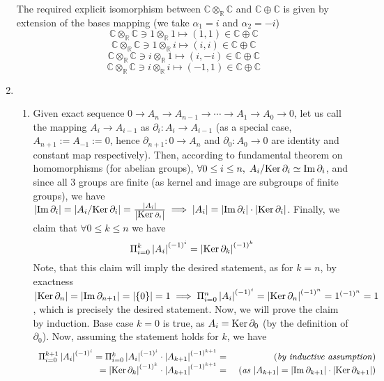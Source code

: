 \documentclass[8pt,fleqn]{article} %
\newcommand{\Ker}{\mbox{\normalfont Ker\,}}
\begin{document}
\begin{enumerate}[label=\bfseries Problem \arabic*.]
		The required explicit isomorphism between $\mathbb{C}\otimes_{\mathbb{R}}\mathbb{C}$ and $\mathbb{C}\oplus\mathbb{C}$ is given
		by extension of the bases mapping (we take $\alpha_1=i$ and $\alpha_2=-i$)
		\[\mathbb{C}\otimes_{\mathbb{R}}\mathbb{C}\ni 1\otimes_{\mathbb{R}}1 \mapsto (1,1) \in\mathbb{C}\oplus\mathbb{C}\]
		\[\mathbb{C}\otimes_{\mathbb{R}}\mathbb{C}\ni 1\otimes_{\mathbb{R}}i \mapsto (i,i)\in\mathbb{C}\oplus\mathbb{C}\]
		\[\mathbb{C}\otimes_{\mathbb{R}}\mathbb{C}\ni i\otimes_{\mathbb{R}}1 \mapsto (i,-i)\in\mathbb{C}\oplus\mathbb{C}\]
		\[\mathbb{C}\otimes_{\mathbb{R}}\mathbb{C}\ni i\otimes_{\mathbb{R}}i \mapsto (-1,1)\in\mathbb{C}\oplus\mathbb{C}\]
	\item \begin{enumerate}[label=(\arabic*).]
			\item Given exact sequence $0\to A_n\to A_{n-1}\to\cdots\to A_1\to A_0\to 0$, let us call the mapping 
				$A_i\to A_{i-1}$ as $\partial_i: A_i\to A_{i-1}$ (as a special case, $A_{n+1}:=A_{-1}:=0$, hence
				$\partial_{n+1}:0\to A_n$ and $\partial_0:A_0\to 0$ are identity and constant map respectively).
				Then, according to fundamental theorem on homomorphisms (for abelian groups), $\forall 0\leq i\leq n,
				\;A_i/\Ker \partial_i\simeq\Im\partial_i$, and since all 3 groups are finite (as kernel and image
				are subgroups of finite groups), we have
				$\myabs{\Im\partial_i}=\myabs{A_i/\Ker\partial_i}=\frac{\myabs{A_i}}
				{\myabs{\Ker\partial_i}}\implies \myabs{A_i}=\myabs{\Im\partial_i}\cdot\myabs{\Ker\partial_i}$.
				Finally, we claim that $\forall 0\leq k\leq n$ we have 
				\[\Pi_{i=0}^k \myabs{A_i}^{(-1)^i}=\myabs{\Ker\partial_k}^{(-1)^k}\]
				Note, that this claim will imply the desired statement, as for $k=n$, by exactness
				$\myabs{\Ker\partial_n}=\myabs{\Im\partial_{n+1}}=\myabs{\mycbra{0}}=1\implies
				\Pi_{i=0}^n \myabs{A_i}^{(-1)^i}=\myabs{\Ker\partial_n}^{(-1)^n}=1^{(-1)^n}=1$, which is precisely
				the desired statement. Now, we will prove the claim by induction. Base case $k=0$ is true, as
				$A_i=\Ker\partial_0$ (by the definition of $\partial_0$). Now, assuming the statement holds
				for $k$, we have
		\[\begin{array}{rr}
			\Pi_{i=0}^{k+1}\myabs{A_i}^{(-1)^i}=\Pi_{i=0}^{k}\myabs{A_i}^{(-1)^i}\cdot\myabs{A_{k+1}}^{(-1)^{k+1}}=
			&\mbox{ (\textit{by inductive assumption}) }\\
			=\myabs{\Ker\partial_k}^{(-1)^k}\cdot\myabs{A_{k+1}}^{(-1)^{k+1}}=
			&\mbox{ (\textit{as $\myabs{A_{k+1}}=\myabs{\Im\partial_{k+1}}\cdot\myabs{\Ker\partial_{{k+1}}}$}) }\\

\end{array}\]
\end{enumerate}
\end{enumerate}
\end{document}
